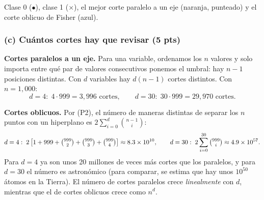 \documentclass[11pt, letterpaper]{article}
\begin{document}
\begin{center}

\small Clase 0 ($\bullet$), clase 1 ($\times$), el mejor corte paralelo a un eje (naranja, punteado) y el corte oblicuo de Fisher (azul).
\end{center}

\subsubsection*{(c) Cuántos cortes hay que revisar (5 pts)}

\textbf{Cortes paralelos a un eje.} Para una variable, ordenamos los $n$ valores y solo importa entre qué par de valores consecutivos ponemos el umbral: hay $n-1$ posiciones distintas. Con $d$ variables hay $d(n-1)$ cortes distintos. Con $n = 1{,}000$:
\[
    d = 4:\; 4 \cdot 999 = 3{,}996 \text{ cortes}, \qquad d = 30:\; 30 \cdot 999 = 29{,}970 \text{ cortes}.
\]

\textbf{Cortes oblicuos.} Por (P2), el número de maneras distintas de separar los $n$ puntos con un hiperplano es $2\sum_{i=0}^{d}\binom{n-1}{i}$:
\[
    d = 4:\; 2\left[1 + 999 + \tbinom{999}{2} + \tbinom{999}{3} + \tbinom{999}{4}\right] \approx 8.3 \times 10^{10},
    \qquad
    d = 30:\; 2\sum_{i=0}^{30}\tbinom{999}{i} \approx 4.9 \times 10^{57}.
\]
Para $d = 4$ ya son unos 20 millones de veces más cortes que los paralelos, y para $d = 30$ el número es astronómico (para comparar, se estima que hay unos $10^{50}$ átomos en la Tierra). El número de cortes paralelos crece \emph{linealmente} con $d$, mientras que el de cortes oblicuos crece como $n^d$.
\end{document}

